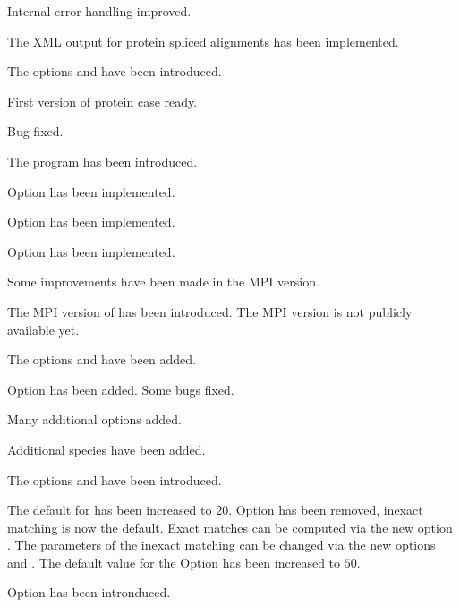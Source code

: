 \documentclass[11pt,a4paper,titlepage]{article}
\begin{document}
 Internal error handling improved.

 The XML output for protein spliced alignments has been implemented.

 The options  and  have been introduced.

 First version of protein case ready.

 Bug fixed.

 The \Callgthconsensus program has been introduced.

 Option  has been implemented.

 Option  has been implemented.

 Option  has been implemented. 

 Some improvements have been made in the MPI version.

 The MPI version of \Gth has been introduced. The MPI version is not publicly available yet.

 The options  and  have been added.

 Option  has been added. Some bugs fixed.

 Many additional options added.

 Additional species have been added.

 The options  and  have been introduced.

 The default for  has been increased to $20$. Option  has been removed, inexact matching is now the default. Exact matches can be computed via the new option . The parameters of the inexact matching can be changed via the new options  and .
The default value for the Option  has been increased to $50$.

 Option  has been intronduced.
\end{document}
